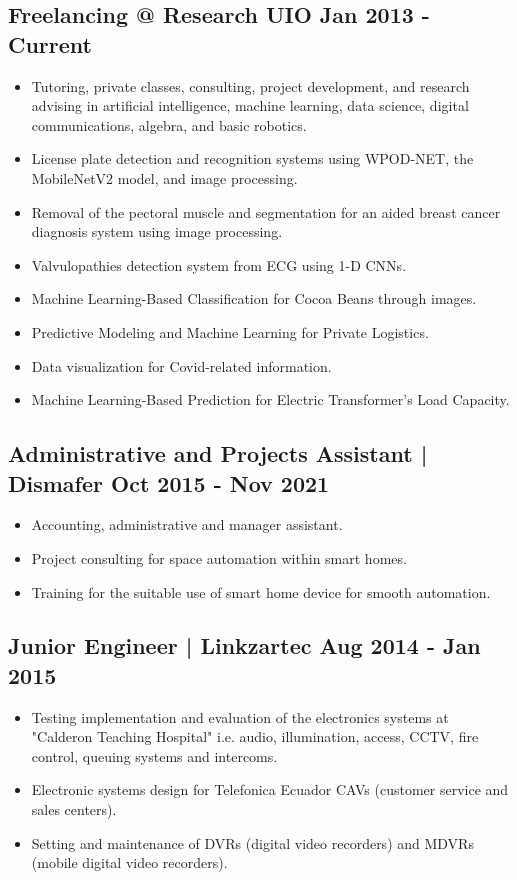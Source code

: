 \documentclass[11pt,a4paper]{article}
\begin{document}
\subsection*{Freelancing @ Research UIO \hfill Jan 2013 - Current}
\begin{itemize}
    \item Tutoring, private classes, consulting, project development, and research advising in artificial intelligence, machine learning, data science, digital communications, algebra, and basic robotics.
    \item License plate detection and recognition systems using WPOD-NET, the MobileNetV2 model, and image processing.
    \item Removal of the pectoral muscle and segmentation for an aided breast cancer diagnosis system using image processing.
    \item Valvulopathies detection system from ECG using 1-D CNNs.
    \item Machine Learning-Based Classification for Cocoa Beans through images.
    \item Predictive Modeling and Machine Learning for Private Logistics.
    \item Data visualization for Covid-related information.
    \item Machine Learning-Based Prediction for Electric Transformer's Load Capacity.
\end{itemize}

\vspace{0.5em}
\subsection*{Administrative and Projects Assistant | Dismafer \hfill Oct 2015 - Nov 2021}
\begin{itemize}
    \item Accounting, administrative and manager assistant.
    \item Project consulting for space automation within smart homes.
    \item Training for the suitable use of smart home device for smooth automation.
\end{itemize}

\vspace{0.5em}
\subsection*{Junior Engineer | Linkzartec \hfill Aug 2014 - Jan 2015}
\begin{itemize}
    \item Testing implementation and evaluation of the electronics systems at "Calderon Teaching Hospital" i.e. audio, illumination, access, CCTV, fire control, queuing systems and intercoms.
    \item Electronic systems design for Telefonica Ecuador CAVs (customer service and sales centers).
    \item Setting and maintenance of DVRs (digital video recorders) and MDVRs (mobile digital video recorders).
\end{itemize}
\end{document}
